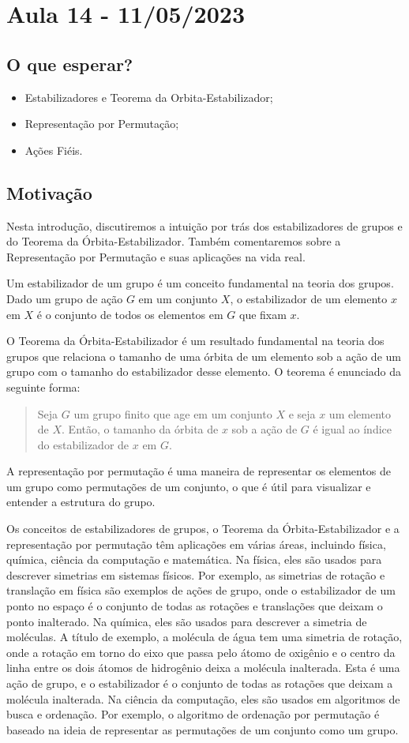 \documentclass[algebra_notes.tex]{subfiles}
\begin{document}
\section{Aula 14 - 11/05/2023}
\subsection{O que esperar?}
\begin{itemize}
	\item Estabilizadores e Teorema da Orbita-Estabilizador;
	\item Representação por Permutação;
	\item Ações Fiéis.
\end{itemize}
\subsection{Motivação}
Nesta introdução, discutiremos a intuição por trás dos estabilizadores de grupos e do Teorema da Órbita-Estabilizador. Também comentaremos sobre a
Representação por Permutação e suas aplicações na vida real.

Um estabilizador de um grupo é um conceito fundamental na teoria dos grupos. Dado um grupo de ação $G$ em um conjunto $X$, o estabilizador de um elemento
$x$ em $X$ é o conjunto de todos os elementos em $G$ que fixam $x$.

O Teorema da Órbita-Estabilizador é um resultado fundamental na teoria dos grupos que relaciona o tamanho de uma órbita de um elemento sob a ação de um grupo
com o tamanho do estabilizador desse elemento. O teorema é enunciado da seguinte forma:
\begin{quote}
	Seja $G$ um grupo finito que age em um conjunto $X$ e seja $x$ um elemento de $X$. Então, o tamanho da órbita de $x$ sob a ação de $G$ é igual ao
	índice do estabilizador de $x$ em $G$.
\end{quote}

A representação por permutação é uma maneira de representar os elementos de um grupo como permutações de um conjunto, o que é útil para visualizar e entender
a estrutura do grupo.

Os conceitos de estabilizadores de grupos, o Teorema da Órbita-Estabilizador e a representação por permutação têm aplicações em várias áreas, incluindo
física, química, ciência da computação e matemática.
Na física, eles são usados para descrever simetrias em sistemas físicos. Por exemplo, as simetrias de rotação e translação em física são exemplos de ações de grupo, onde o estabilizador de um ponto no espaço é o conjunto de todas as rotações e translações que deixam o ponto inalterado.
Na química, eles são usados para descrever a simetria de moléculas. A título de exemplo, a molécula de água tem uma simetria de rotação, onde a rotação em torno do eixo que passa pelo átomo de oxigênio e o centro da linha entre os dois átomos de hidrogênio deixa a molécula inalterada. Esta é uma ação de grupo, e o estabilizador é o conjunto de todas as rotações que deixam a molécula inalterada.
Na ciência da computação, eles são usados em algoritmos de busca e ordenação. Por exemplo, o algoritmo de ordenação por permutação é baseado na ideia de representar as permutações de um conjunto como um grupo.
\end{document}
